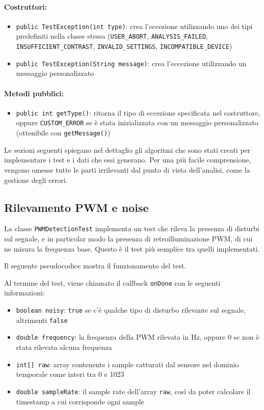 \paragraph{Costruttori:}\begin{itemize}
	\item \texttt{public TestException(int type)}: crea l'eccezione utilizzando uno dei tipi predefiniti nella classe stessa (\texttt{USER\_ABORT}, \texttt{ANALYSIS\_FAILED}, \texttt{INSUFFICIENT\_CONTRAST}, \texttt{INVALID\_SETTINGS}, \texttt{INCOMPATIBLE\_DEVICE})
	\item \texttt{public TestException(String message)}: crea l'eccezione utilizzando un messaggio personalizzato
\end{itemize}

\paragraph{Metodi pubblici:}\begin{itemize}
	\item \texttt{public int getType()}: ritorna il tipo di eccezione specificata nel costruttore, oppure \texttt{CUSTOM\_ERROR} se è stata inizializzata con un messaggio personalizzato (ottenibile con \texttt{getMessage()})
\end{itemize}

Le sezioni seguenti spiegano nel dettaglio gli algoritmi che sono stati creati per implementare i test e i dati che essi generano. Per una più facile comprensione, vengono omesse tutte le parti irrilevanti dal punto di vista dell'analisi, come la gestione degli errori.

\subsection{Rilevamento PWM e noise}
La classe \texttt{PWMDetectionTest} implementa un test che rileva la presenza di disturbi sul segnale, e in particolar modo la presenza di retroilluminazione PWM, di cui ne misura la frequenza base. Questo è il test più semplice tra quelli implementati.

Il seguente pseudocodice mostra il funzionamento del test.


Al termine del test, viene chiamato il callback \texttt{onDone} con le seguenti informazioni:\begin{itemize}
	\item \texttt{boolean noisy}: \texttt{true} se c'è qualche tipo di disturbo rilevante sul segnale, altrimenti \texttt{false}
	\item \texttt{double frequency}: la frequenza della PWM rilevata in Hz, oppure 0 se non è stata rilevata alcuna frequenza
	\item \texttt{int[] raw}: array contenente i sample catturati dal sensore nel dominio temporale come interi tra 0 e 1023
	\item \texttt{double sampleRate}: il sample rate dell'array \texttt{raw}, così da poter calcolare il timestamp a cui corrisponde ogni sample
\end{itemize}

